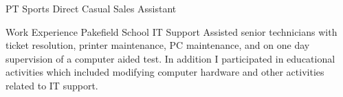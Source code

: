 \documentclass[10pt]{article} %
\begin{document}
\begin{paracol}{2}
{PT} %
{Sports Direct} %
{Casual Sales Assistant} %
{}


{Work Experience} %
{Pakefield School} %
{IT Support} %
{Assisted senior technicians with ticket resolution, printer maintenance, PC maintenance, and on one day supervision of a computer aided test. In addition I participated in educational activities which included modifying computer hardware and other activities related to IT support.} %



\vspace{-\baselineskip}\medskip %


\switchcolumn %



\end{paracol}
\end{document}
